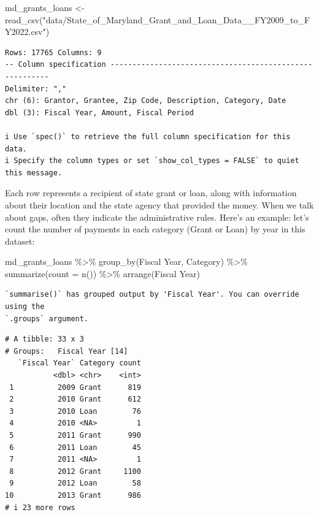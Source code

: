 \documentclass[
  letterpaper,
  DIV=11,
  numbers=noendperiod]{scrreprt}
\newenvironment{Shaded}{\begin{snugshade}}{\end{snugshade}}
\newcommand{\AttributeTok}[1]{\textcolor[rgb]{0.40,0.45,0.13}{#1}}
\newcommand{\FunctionTok}[1]{\textcolor[rgb]{0.28,0.35,0.67}{#1}}
\newcommand{\NormalTok}[1]{\textcolor[rgb]{0.00,0.23,0.31}{#1}}
\newcommand{\OtherTok}[1]{\textcolor[rgb]{0.00,0.23,0.31}{#1}}
\newcommand{\SpecialCharTok}[1]{\textcolor[rgb]{0.37,0.37,0.37}{#1}}
\newcommand{\StringTok}[1]{\textcolor[rgb]{0.13,0.47,0.30}{#1}}
\begin{document}
\begin{Shaded}
\begin{Highlighting}[]
\NormalTok{md\_grants\_loans }\OtherTok{\textless{}{-}} \FunctionTok{read\_csv}\NormalTok{(}\StringTok{"data/State\_of\_Maryland\_Grant\_and\_Loan\_Data\_\_FY2009\_to\_FY2022.csv"}\NormalTok{)}
\end{Highlighting}
\end{Shaded}

\begin{verbatim}
Rows: 17765 Columns: 9
-- Column specification --------------------------------------------------------
Delimiter: ","
chr (6): Grantor, Grantee, Zip Code, Description, Category, Date
dbl (3): Fiscal Year, Amount, Fiscal Period

i Use `spec()` to retrieve the full column specification for this data.
i Specify the column types or set `show_col_types = FALSE` to quiet this message.
\end{verbatim}

Each row represents a recipient of state grant or loan, along with
information about their location and the state agency that provided the
money. When we talk about gaps, often they indicate the administrative
rules. Here's an example: let's count the number of payments in each
category (Grant or Loan) by year in this dataset:

\begin{Shaded}
\begin{Highlighting}[]
\NormalTok{md\_grants\_loans }\SpecialCharTok{\%\textgreater{}\%} 
  \FunctionTok{group\_by}\NormalTok{(}\StringTok{\textasciigrave{}}\AttributeTok{Fiscal Year}\StringTok{\textasciigrave{}}\NormalTok{, Category) }\SpecialCharTok{\%\textgreater{}\%} 
  \FunctionTok{summarize}\NormalTok{(}\AttributeTok{count =} \FunctionTok{n}\NormalTok{()) }\SpecialCharTok{\%\textgreater{}\%} 
  \FunctionTok{arrange}\NormalTok{(}\StringTok{\textasciigrave{}}\AttributeTok{Fiscal Year}\StringTok{\textasciigrave{}}\NormalTok{)}
\end{Highlighting}
\end{Shaded}

\begin{verbatim}
`summarise()` has grouped output by 'Fiscal Year'. You can override using the
`.groups` argument.
\end{verbatim}

\begin{verbatim}
# A tibble: 33 x 3
# Groups:   Fiscal Year [14]
   `Fiscal Year` Category count
           <dbl> <chr>    <int>
 1          2009 Grant      819
 2          2010 Grant      612
 3          2010 Loan        76
 4          2010 <NA>         1
 5          2011 Grant      990
 6          2011 Loan        45
 7          2011 <NA>         1
 8          2012 Grant     1100
 9          2012 Loan        58
10          2013 Grant      986
# i 23 more rows
\end{verbatim}
\end{document}
